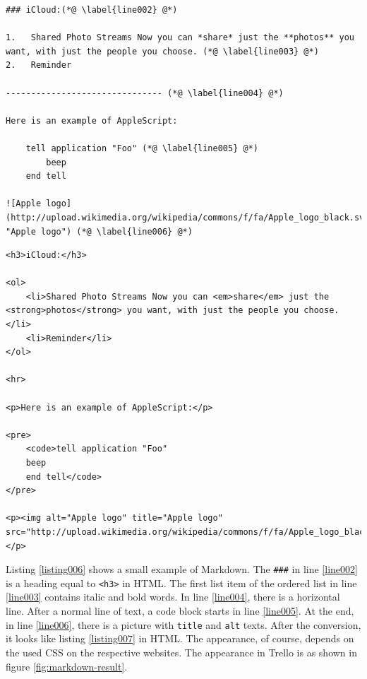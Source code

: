 \begin{lstlisting}[aboveskip=1\baselineskip, style=bash, caption=Example for a text written in Markdown.\index{Markdown}, label=listing006]
### iCloud:(*@ \label{line002} @*)

1.   Shared Photo Streams Now you can *share* just the **photos** you want, with just the people you choose. (*@ \label{line003} @*)
2.   Reminder

------------------------------- (*@ \label{line004} @*)

Here is an example of AppleScript:

    tell application "Foo" (*@ \label{line005} @*)
        beep
    end tell

![Apple logo](http://upload.wikimedia.org/wikipedia/commons/f/fa/Apple_logo_black.svg "Apple logo") (*@ \label{line006} @*)
\end{lstlisting}


\begin{lstlisting}[aboveskip=1\baselineskip, style=html, caption=Listing \ref{listing006} converted to HTML., label=listing007]
<h3>iCloud:</h3>

<ol>
	<li>Shared Photo Streams Now you can <em>share</em> just the <strong>photos</strong> you want, with just the people you choose.</li>
	<li>Reminder</li>
</ol>

<hr>

<p>Here is an example of AppleScript:</p>

<pre>
	<code>tell application "Foo"
	beep
	end tell</code>
</pre>

<p><img alt="Apple logo" title="Apple logo" src="http://upload.wikimedia.org/wikipedia/commons/f/fa/Apple_logo_black.svg"></p>
\end{lstlisting} 

Listing \ref{listing006} shows a small example of Markdown. The \lstinline{###} in line \ref{line002} is a heading equal to \lstinline{<h3>} in HTML. The first list item of the ordered list in line \ref{line003} contains italic and bold words. In line \ref{line004}, there is a horizontal line. After a normal line of text, a code block starts in line \ref{line005}. At the end, in line \ref{line006}, there is a picture with \lstinline{title} and \lstinline{alt} texts. After the conversion, it looks like listing \ref{listing007} in HTML. The appearance, of course, depends on the used CSS on the respective websites. The appearance in Trello is as shown in figure \ref{fig:markdown-result}.


